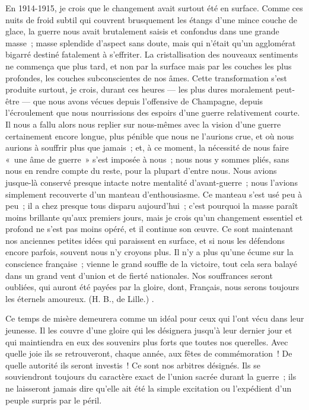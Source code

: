 \documentclass[french,twoside]{book} %
\begin{document}
{ En 1914-1915, je crois que le changement avait surtout été en surface. Comme ces nuits de froid subtil qui couvrent brusquement les étangs d’une mince couche de glace, la guerre nous avait brutalement saisis et confondus dans une grande masse ; masse splendide d’aspect sans doute, mais qui n’était qu’un agglomérat bigarré destiné fatalement à s’effriter. La cristallisation des nouveaux sentiments ne commença que plus tard, et non par la surface mais par les couches les plus profondes, les couches subconscientes de nos âmes. Cette transformation s’est produite surtout, je crois, durant ces heures — les plus dures moralement peut-être — que nous avons vécues depuis l’offensive de Champagne, depuis l’écroulement que nous nourrissions des espoirs d’une guerre relativement courte. Il nous a fallu alors nous replier sur nous-mêmes avec la vision d’une guerre certainement encore longue, plus pénible que nous ne l’aurions crue, et où nous aurions à souffrir plus que jamais ; et, à ce moment, la nécessité de nous faire « une âme de guerre » s’est imposée à nous ; nous nous y sommes pliés, sans nous en rendre compte du reste, pour la plupart d’entre nous. Nous avions jusque-là conservé presque intacte notre mentalité d’avant-guerre ; nous l’avions simplement recouverte d’un manteau d’enthousiasme. Ce manteau s’est usé peu à peu ; il a chez presque tous disparu aujourd’hui ; c’est pourquoi la masse paraît moins brillante qu’aux premiers jours, mais je crois qu’un changement essentiel et profond ne s’est pas moins opéré, et il continue son œuvre. Ce sont maintenant nos anciennes petites idées qui paraissent en surface, et si nous les défendons encore parfois, souvent nous n’y croyons plus. Il n’y a plus qu’une écume sur la conscience française ; vienne le grand souffle de la victoire, tout cela sera balayé dans un grand vent d’union et de fierté nationales. Nos souffrances seront oubliées, qui auront été payées par la gloire, dont, Français, nous serons toujours les éternels amoureux. (H. B., de Lille.)
 }.‌\par
Ce temps de misère demeurera comme un idéal pour ceux qui l’ont vécu dans leur jeunesse. Il les couvre d’une gloire qui les désignera jusqu’à leur dernier jour et qui maintiendra en eux des souvenirs plus forts que toutes nos querelles. Avec quelle joie ils se retrouveront, chaque année, aux fêtes de commémoration ! De quelle autorité ils seront investis ! Ce sont nos arbitres désignés. Ils se souviendront toujours du caractère exact de l’union sacrée durant la guerre ; ils ne laisseront jamais dire qu’elle ait été la simple excitation ou l’expédient d’un peuple surpris par le péril.‌\par
\end{document}
